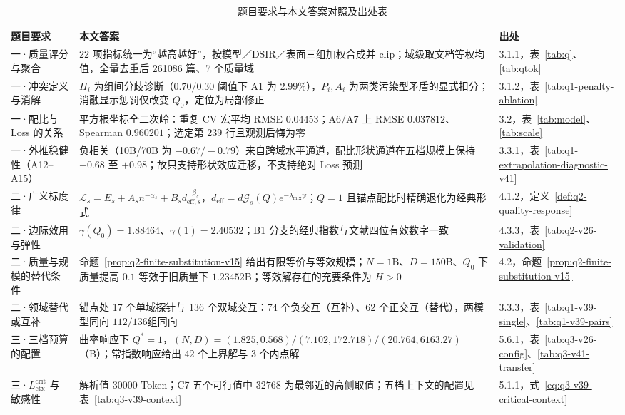 \begin{table}[H]\centering\scriptsize
\setlength{\tabcolsep}{3pt}
\caption{题目要求与本文答案对照及出处表}\label{tab:v42-answer-index}
\begin{tabular}{P{3.8cm}P{8.9cm}P{2.2cm}}\toprule
题目要求 & 本文答案 & 出处\\\midrule
一·质量评分与聚合 & 22 项指标统一为“越高越好”，按模型／DSIR／表面三组加权合成并 clip；域级取文档等权均值，全量去重后 261086 篇、7 个质量域 & 3.1.1，表~\ref{tab:q}、\ref{tab:qtok}\\
一·冲突定义与消解 & $H_i$ 为组间分歧诊断（$0.70/0.30$ 阈值下 A1 为 $2.99\%$），$P_i,A_i$ 为两类污染型矛盾的显式扣分；消融显示惩罚仅改变 $Q_0$，定位为局部修正 & 3.1.2，表~\ref{tab:q1-penalty-ablation}\\
一·配比与 Loss 的关系 & 平方根坐标全二次岭：重复 CV 宏平均 RMSE $0.04453$；A6/A7 上 RMSE $0.037812$、Spearman $0.960201$；选定第 239 行且观测后悔为零 & 3.2，表~\ref{tab:model}、\ref{tab:scale}\\
一·外推稳健性（A12--A15） & 负相关（10B/70B 为 $-0.67/-0.79$）来自跨域水平通道，配比形状通道在五档规模上保持 $+0.68$ 至 $+0.98$；故只支持形状效应迁移，不支持绝对 Loss 预测 & 3.3.1，表~\ref{tab:q1-extrapolation-diagnostic-v41}\\
二·广义标度律 & $\mathcal L_s=E_s+A_sn^{-\alpha_s}+B_sd_{\mathrm{eff},s}^{-\beta_s}$，$d_{\mathrm{eff}}=d\mathcal G_s(Q)e^{-\lambda_{\mathrm{mix}}\psi}$；$Q=1$ 且锚点配比时精确退化为经典形式 & 4.1.2，定义~\ref{def:q2-quality-response}\\
二·边际效用与弹性 & $\gamma(Q_0)=1.88464$、$\gamma(1)=2.40532$；B1 分支的经典指数与文献四位有效数字一致 & 4.3.3，表~\ref{tab:q2-v26-validation}\\
二·质量与规模的替代条件 & 命题~\ref{prop:q2-finite-substitution-v15} 给出有限等价与等效规模；$N=1$B、$D=150$B、$Q_0$ 下质量提高 $0.1$ 等效于旧质量下 $1.23452$B；等效解存在的充要条件为 $H>0$ & 4.2，命题~\ref{prop:q2-finite-substitution-v15}\\
二·领域替代或互补 & 锚点处 17 个单域探针与 136 个双域交互：74 个负交互（互补）、62 个正交互（替代），两模型同向 $112/136$组同向 & 3.3.3，表~\ref{tab:q1-v39-single}、\ref{tab:q1-v39-pairs}\\
三·三档预算的配置 & 曲率响应下 $Q^*=1$，$(N,D)=(1.825,0.568)/(7.102,172.718)/(20.764,6163.27)$（B）；常指数响应给出 $42$ 个上界解与 $3$ 个内点解 & 5.6.1，表~\ref{tab:q3-v26-config}、\ref{tab:q3-v41-transfer}\\
三·$L_{\mathrm{ctx}}^{\mathrm{crit}}$ 与敏感性 & 解析值 $30000$ Token；C7 五个可行值中 $32768$ 为最邻近的高侧取值；五档上下文的配置见表~\ref{tab:q3-v39-context} & 5.1.1，式~\eqref{eq:q3-v39-critical-context}\\

\end{tabular}
\end{table}
